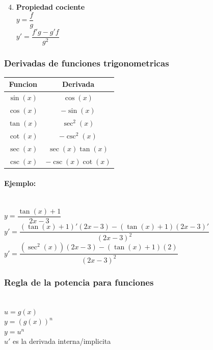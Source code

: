 \documentclass[stu, 12pt, a4paper, donotrepeattitle, floatsintext, natbib]{apa7}
\begin{document}
    \begin{paracol}{2}
        \begin{enumerate}
            \setcounter{enumi}{3}
            \item \textbf{Propiedad cociente}\\[0.5cm]
            $y=\dfrac{f}{g}$\\[0.5cm]
            $y'=\dfrac{f'g-g'f}{g^2}$\\[0.5cm]
        \end{enumerate}
    \end{paracol}

    \subsubsection{Derivadas de funciones trigonometricas}
    \begin{table}
        \centering
        \begin{tabular}{|c|c|}
            \hline
            \textbf{Funcion} & \textbf{Derivada} \\
            \hline
            $\sin(x)$        & $\cos(x)$         \\
            \hline
            $\cos(x)$        & $-\sin(x)$        \\
            \hline
            $\tan(x)$        & $\sec^2(x)$       \\
            \hline
            $\cot(x)$        & $-\csc^2(x)$      \\
            \hline
            $\sec(x)$        & $\sec(x)\tan(x)$  \\
            \hline
            $\csc(x)$        & $-\csc(x)\cot(x)$ \\
            \hline
        \end{tabular}\label{tab:table2}
    \end{table}

    \paragraph{Ejemplo:}\\[0.5cm]
    $y=\dfrac{\tan(x)+1}{2x-3}$\\[0.5cm]
    $y'=\dfrac{(\tan(x)+1)'(2x-3)-(\tan(x)+1)(2x-3)'}{(2x-3)^2}$\\[0.5cm]
    $y'=\dfrac{(\sec^2(x))(2x-3)-(\tan(x)+1)(2)}{(2x-3)^2}$\\[0.5cm]

    \subsubsection{Regla de la potencia para funciones}
    \\[0.5cm]
    $u=g(x)$\\[0.5cm]
    $y=(g(x))^n$\\[0.5cm]
    $y=u^n$\\[1cm]
    $u'$ es la derivada interna/implicita\\[0.5cm]
\end{document}
